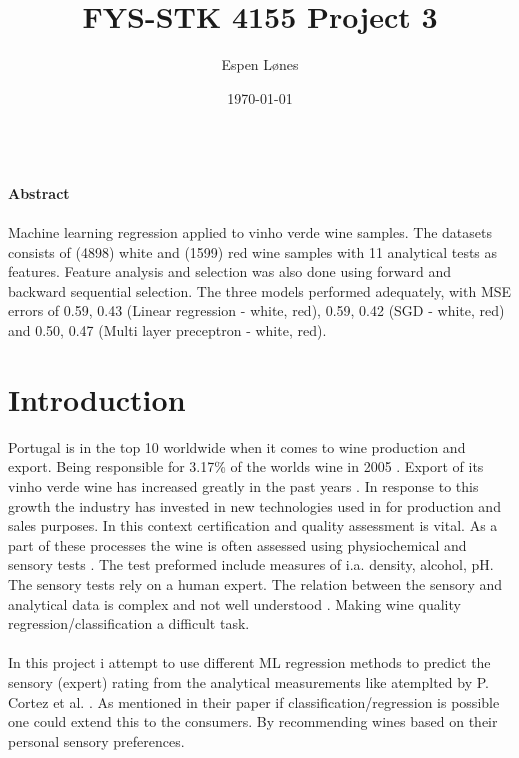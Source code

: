 \documentclass[12pt, letterpaper, twoside]{article}
\begin{document}
\title{FYS-STK 4155 Project 3}
\author{Espen Lønes}
\date{\today}
\maketitle
\ \\
\textbf{Abstract}\\
\ \\
Machine learning regression applied to vinho verde wine samples. The datasets consists of (4898) white and (1599) red wine samples with 11 analytical tests as features. Feature analysis and selection was also done using forward and backward sequential selection. The three models performed adequately, with MSE errors of 0.59, 0.43 (Linear regression - white, red), 0.59, 0.42 (SGD - white, red) and 0.50, 0.47 (Multi layer preceptron - white, red).\\
\section{Introduction}
Portugal is in the top 10 worldwide when it comes to wine production and export. Being responsible for    3.17\% of the worlds wine in 2005 \cite{FAO}. Export of its vinho verde wine has increased greatly in the past years \cite{CVRVV}. In response to this growth the industry has invested in new technologies used in for production and sales purposes. In this context certification and quality assessment is vital. As a part of these processes the wine is often assessed using physiochemical and sensory tests \cite{Ebeler}. The test preformed include measures of i.a. density, alcohol, pH. The sensory tests rely on a human expert. The relation between the sensory and analytical data is complex and not well understood \cite{PvS}. Making wine quality regression/classification a difficult task.\\
\ \\
In this project i attempt to use different ML regression methods to predict the sensory (expert) rating from the analytical measurements like atemplted by P. Cortez et al. \cite{Citation paper}. As mentioned in their paper if classification/regression is possible one could extend this to the consumers. By recommending wines based on their personal sensory preferences.\\
\newpage
\ \\
\end{document}
